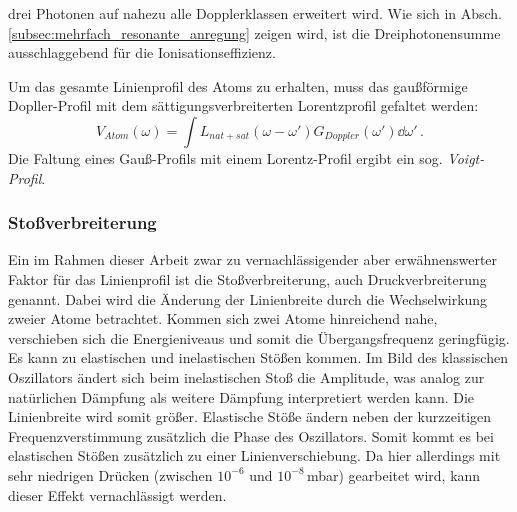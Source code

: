 drei Photonen auf nahezu alle Dopplerklassen erweitert wird. Wie sich in Absch.
\ref{subsec:mehrfach_resonante_anregung} zeigen wird, ist die
Dreiphotonensumme ausschlaggebend für die Ionisationseffizienz.\par
Um das gesamte Linienprofil des Atoms zu erhalten, muss das gaußförmige
Dopller-Profil mit dem sättigungsverbreiterten Lorentzprofil gefaltet werden:
\begin{equation}\label{eq:voigt_doppler}
	V_{Atom}(\omega)=\int{L_{nat+sat}(\omega-\omega')G_{Doppler}(\omega')\dd\omega'}\,.
\end{equation}
Die Faltung eines Gauß-Profils mit einem Lorentz-Profil ergibt ein sog.
\textit{Voigt-Profil}.

\subsubsection{Stoßverbreiterung}\label{subsubsec:stossverbreiterung}
Ein im Rahmen dieser Arbeit zwar zu vernachlässigender aber erwähnenswerter
Faktor für das Linienprofil ist die Stoßverbreiterung, auch
Druckverbreiterung genannt. Dabei wird die Änderung der Linienbreite durch die
Wechselwirkung zweier Atome betrachtet. Kommen sich zwei Atome hinreichend nahe,
verschieben sich die Energieniveaus und somit die Übergangsfrequenz geringfügig. Es kann zu
elastischen und inelastischen Stößen kommen. Im Bild des klassischen Oszillators
ändert sich beim inelastischen Stoß die Amplitude, was analog zur natürlichen
Dämpfung als weitere Dämpfung interpretiert werden kann. Die Linienbreite wird
somit größer. Elastische Stöße ändern neben der kurzzeitigen Frequenzverstimmung
zusätzlich die Phase des Oszillators. Somit kommt es bei elastischen Stößen
zusätzlich zu einer Linienverschiebung. Da hier allerdings mit
sehr niedrigen Drücken (zwischen $10^{-6}$ und $10^{-8}\,$mbar) gearbeitet wird,
kann dieser Effekt vernachlässigt werden.


